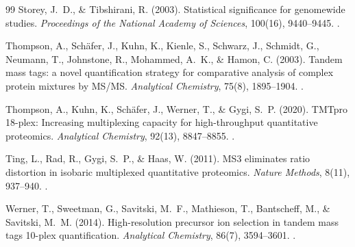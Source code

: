 \documentclass[11pt,oneside]{book}
\begin{document}
\begin{thebibliography}{99}
Storey, J.~D., \& Tibshirani, R. (2003). Statistical significance for genomewide studies. \textit{Proceedings of the National Academy of Sciences}, 100(16), 9440--9445. .

Thompson, A., Sch{\"a}fer, J., Kuhn, K., Kienle, S., Schwarz, J., Schmidt, G., Neumann, T., Johnstone, R., Mohammed, A.~K., \& Hamon, C. (2003). Tandem mass tags: a novel quantification strategy for comparative analysis of complex protein mixtures by MS/MS. \textit{Analytical Chemistry}, 75(8), 1895--1904. .

Thompson, A., Kuhn, K., Sch{\"a}fer, J., Werner, T., \& Gygi, S.~P. (2020). TMTpro 18-plex: Increasing multiplexing capacity for high-throughput quantitative proteomics. \textit{Analytical Chemistry}, 92(13), 8847--8855. .

Ting, L., Rad, R., Gygi, S.~P., \& Haas, W. (2011). MS3 eliminates ratio distortion in isobaric multiplexed quantitative proteomics. \textit{Nature Methods}, 8(11), 937--940. .

Werner, T., Sweetman, G., Savitski, M.~F., Mathieson, T., Bantscheff, M., \& Savitski, M.~M. (2014). High-resolution precursor ion selection in tandem mass tags 10-plex quantification. \textit{Analytical Chemistry}, 86(7), 3594--3601. .

\end{thebibliography}
\end{document}
